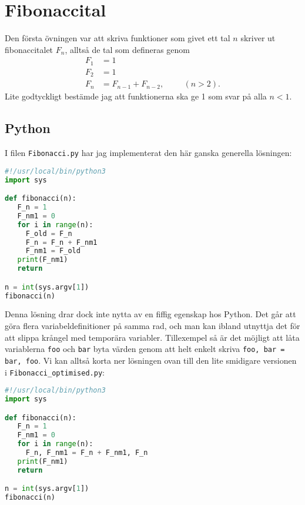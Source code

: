 \documentclass[10pt, twoside,a4paper]{article}
\begin{document}
\newpage
\tableofcontents


\newpage
\section{Fibonaccital}
Den första övningen var att skriva funktioner som givet ett tal $n$ skriver ut fibonaccitalet $F_n$, alltså de tal som defineras genom
\begin{align}
F_1 &= 1 \\
F_2 &= 1 \\
F_n &= F_{n-1} + F_{n-2}, \hspace{1cm}(n > 2).
\end{align}
Lite godtyckligt bestämde jag att funktionerna ska ge 1 som svar på alla $n < 1$.

\subsection{Python}
I filen \verb+Fibonacci.py+ har jag implementerat den här ganska generella lösningen: 
\begin{lstlisting}[language=python]
#!/usr/local/bin/python3
import sys

def fibonacci(n):
   F_n = 1
   F_nm1 = 0
   for i in range(n):
     F_old = F_n
     F_n = F_n + F_nm1
     F_nm1 = F_old
   print(F_nm1)
   return

n = int(sys.argv[1])
fibonacci(n)
\end{lstlisting}
Denna lösning drar dock inte nytta av en fiffig egenskap hos Python. Det går att göra flera variabeldefinitioner på samma rad, och man kan ibland utnyttja det för att slippa krångel med temporära variabler. Tillexempel så är det möjligt att låta variablerna \verb+foo+ och \verb+bar+ byta värden genom att helt enkelt skriva \verb+foo, bar = bar, foo+. Vi kan alltså korta ner lösningen ovan till den lite smidigare versionen i \verb+Fibonacci_optimised.py+:
\begin{lstlisting}[language=python]
#!/usr/local/bin/python3
import sys

def fibonacci(n):
   F_n = 1
   F_nm1 = 0
   for i in range(n):
     F_n, F_nm1 = F_n + F_nm1, F_n
   print(F_nm1)
   return

n = int(sys.argv[1])
fibonacci(n)
\end{lstlisting}

\newpage
\end{document}
